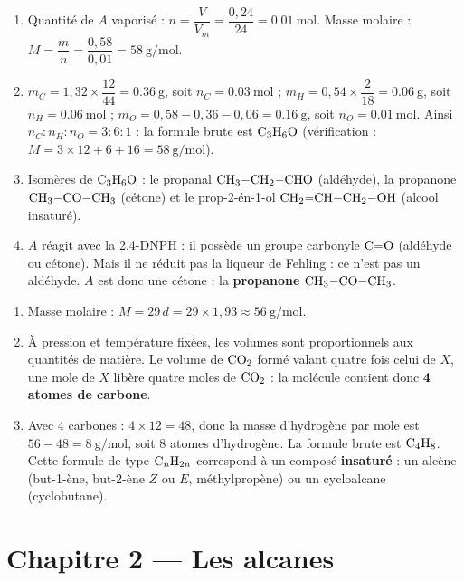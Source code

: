 \begin{enumerate}[label=\arabic*)]
\item Quantité de $A$ vaporisé : $n = \dfrac{V}{V_m} = \dfrac{0{,}24}{24} = \SI{0.01}{\mol}$.
Masse molaire : $M = \dfrac{m}{n} = \dfrac{0{,}58}{0{,}01} = \SI{58}{\gram\per\mol}$.
\item $m_C = 1{,}32\times\dfrac{12}{44} = \SI{0.36}{\gram}$, soit $n_C = \SI{0.03}{\mol}$ ;
$m_H = 0{,}54\times\dfrac{2}{18} = \SI{0.06}{\gram}$, soit $n_H = \SI{0.06}{\mol}$ ;
$m_O = 0{,}58 - 0{,}36 - 0{,}06 = \SI{0.16}{\gram}$, soit $n_O = \SI{0.01}{\mol}$.
Ainsi $n_C : n_H : n_O = 3 : 6 : 1$ : la formule brute est $\ce{C3H6O}$ (vérification :
$M = 3\times12 + 6 + 16 = \SI{58}{\gram\per\mol}$).
\item Isomères de $\ce{C3H6O}$ : le propanal $\ce{CH3-CH2-CHO}$ (aldéhyde), la
propanone $\ce{CH3-CO-CH3}$ (cétone) et le prop-2-én-1-ol $\ce{CH2=CH-CH2-OH}$
(alcool insaturé).
\item $A$ réagit avec la 2,4-DNPH : il possède un groupe carbonyle $\ce{C=O}$ (aldéhyde
ou cétone). Mais il ne réduit pas la liqueur de Fehling : ce n'est pas un aldéhyde.
$A$ est donc une cétone : la \textbf{propanone} $\ce{CH3-CO-CH3}$.
\end{enumerate}

\begin{enumerate}[label=\arabic*)]
\item Masse molaire : $M = 29\,d = 29\times1{,}93 \approx \SI{56}{\gram\per\mol}$.
\item À pression et température fixées, les volumes sont proportionnels aux quantités
de matière. Le volume de $\ce{CO2}$ formé valant quatre fois celui de $X$, une mole de
$X$ libère quatre moles de $\ce{CO2}$ : la molécule contient donc \textbf{4 atomes de carbone}.
\item Avec 4 carbones : $4\times12 = 48$, donc la masse d'hydrogène par mole est
$56 - 48 = \SI{8}{\gram\per\mol}$, soit 8 atomes d'hydrogène. La formule brute est
$\ce{C4H8}$. Cette formule de type $\ce{C_nH_{2n}}$ correspond à un composé
\textbf{insaturé} : un alcène (but-1-ène, but-2-ène $Z$ ou $E$, méthylpropène) ou un
cycloalcane (cyclobutane).
\end{enumerate}

\section{Chapitre 2 — Les alcanes}

